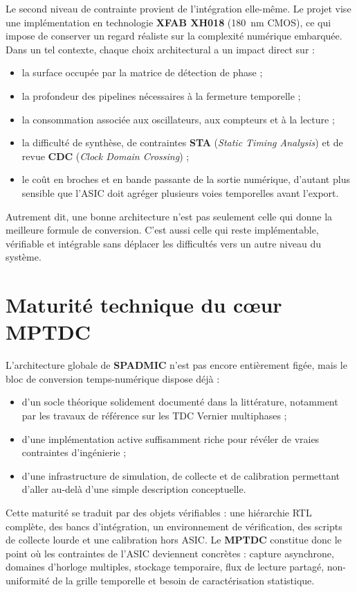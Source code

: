Le second niveau de contrainte provient de l'intégration elle-même. Le projet vise une implémentation en technologie \textbf{XFAB XH018} (\SI{180}{\nano\meter} CMOS), ce qui impose de conserver un regard réaliste sur la complexité numérique embarquée. Dans un tel contexte, chaque choix architectural a un impact direct sur :
\begin{itemize}
    \item la surface occupée par la matrice de détection de phase ;
    \item la profondeur des pipelines nécessaires à la fermeture temporelle ;
    \item la consommation associée aux oscillateurs, aux compteurs et à la lecture ;
    \item la difficulté de synthèse, de contraintes \textbf{STA} (\textit{Static Timing Analysis}) et de revue \textbf{CDC} (\textit{Clock Domain Crossing}) ;
    \item le coût en broches et en bande passante de la sortie numérique, d'autant plus sensible que l'ASIC doit agréger plusieurs voies temporelles avant l'export.
\end{itemize}

Autrement dit, une bonne architecture n'est pas seulement celle qui donne la meilleure formule de conversion. C'est aussi celle qui reste implémentable, vérifiable et intégrable sans déplacer les difficultés vers un autre niveau du système.

\section{Maturité technique du cœur MPTDC}

L'architecture globale de \textbf{SPADMIC} n'est pas encore entièrement figée, mais le bloc de conversion temps-numérique dispose déjà :
\begin{itemize}
    \item d'un socle théorique solidement documenté dans la littérature, notamment par les travaux de référence sur les TDC Vernier multiphases \cite{annagrebah2021thesis} ;
    \item d'une implémentation active suffisamment riche pour révéler de vraies contraintes d'ingénierie ;
    \item d'une infrastructure de simulation, de collecte et de calibration permettant d'aller au-delà d'une simple description conceptuelle.
\end{itemize}

Cette maturité se traduit par des objets vérifiables : une hiérarchie RTL complète, des bancs d'intégration, un environnement de vérification, des scripts de collecte lourde et une calibration hors ASIC. Le \textbf{MPTDC} constitue donc le point où les contraintes de l'ASIC deviennent concrètes : capture asynchrone, domaines d'horloge multiples, stockage temporaire, flux de lecture partagé, non-uniformité de la grille temporelle et besoin de caractérisation statistique.

